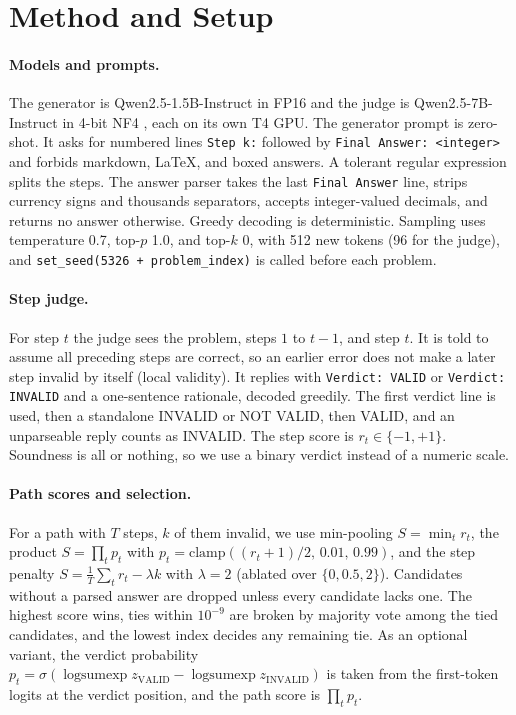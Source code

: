 \documentclass{article}
\begin{document}
\section{Method and Setup}
\paragraph{Models and prompts.} The generator is Qwen2.5-1.5B-Instruct \citep{qwen25} in FP16 and the judge is Qwen2.5-7B-Instruct in 4-bit NF4 \citep{dettmers2023qlora}, each on its own T4 GPU. The generator prompt is zero-shot. It asks for numbered lines \texttt{Step k:} followed by \texttt{Final Answer: <integer>} and forbids markdown, LaTeX, and boxed answers. A tolerant regular expression splits the steps. The answer parser takes the last \texttt{Final Answer} line, strips currency signs and thousands separators, accepts integer-valued decimals, and returns no answer otherwise. Greedy decoding is deterministic. Sampling uses temperature 0.7, top-$p$ 1.0, and top-$k$ 0, with 512 new tokens (96 for the judge), and \texttt{set\_seed(5326 + problem\_index)} is called before each problem.

\paragraph{Step judge.} For step $t$ the judge sees the problem, steps $1$ to $t-1$, and step $t$. It is told to assume all preceding steps are correct, so an earlier error does not make a later step invalid by itself (local validity). It replies with \texttt{Verdict: VALID} or \texttt{Verdict: INVALID} and a one-sentence rationale, decoded greedily. The first verdict line is used, then a standalone INVALID or NOT VALID, then VALID, and an unparseable reply counts as INVALID. The step score is $r_t\in\{-1,+1\}$. Soundness is all or nothing, so we use a binary verdict instead of a numeric scale.

\paragraph{Path scores and selection.} For a path with $T$ steps, $k$ of them invalid, we use min-pooling $S=\min_t r_t$, the product $S=\prod_t p_t$ with $p_t=\mathrm{clamp}((r_t+1)/2,\,0.01,\,0.99)$, and the step penalty $S=\tfrac1T\sum_t r_t-\lambda k$ with $\lambda=2$ (ablated over $\{0,0.5,2\}$). Candidates without a parsed answer are dropped unless every candidate lacks one. The highest score wins, ties within $10^{-9}$ are broken by majority vote among the tied candidates, and the lowest index decides any remaining tie. As an optional variant, the verdict probability $p_t=\sigma(\operatorname{logsumexp}z_{\mathrm{VALID}}-\operatorname{logsumexp}z_{\mathrm{INVALID}})$ is taken from the first-token logits at the verdict position, and the path score is $\prod_t p_t$.
\end{document}
